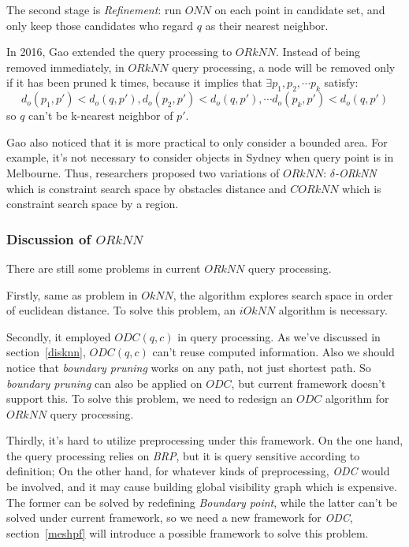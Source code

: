 The second stage is \textit{Refinement}: run $ONN$ on each point in candidate set, and only keep those
candidates who regard $q$ as their nearest neighbor.

In 2016, Gao extended the query processing to $\mathit{ORkNN}$\cite{gao2016reverse}. Instead of being
removed immediately, in $\mathit{ORkNN}$ query processing, a node will be removed only if it has been
pruned k times, because it implies that
$\exists p_1, p_2,\cdots p_k$ satisfy:
$$
d_o(p_1, p') < d_o(q, p'), d_o(p_2, p') < d_o(q, p'),
\cdots d_o(p_k, p') < d_o(q, p')
$$
so $q$ can't be k-nearest neighbor of $p'$.

Gao also noticed that it is more practical to only consider a bounded area. For example,
it's not necessary to consider objects in Sydney when query point is in Melbourne. Thus,
researchers proposed two variations of $\mathit{ORkNN}$: $\delta$\textit{-ORkNN} which is constraint search space by obstacles
distance and $\mathit{CORkNN}$ which is constraint search space by a region.

\subsubsection{Discussion of $\mathit{ORkNN}$}\label{disorknn}
There are still some problems in current $\mathit{ORkNN}$ query processing.

Firstly, same as problem in $\mathit{OkNN}$, the algorithm explores search space in order of euclidean
distance. To solve this problem, an $\mathit{iOkNN}$ algorithm is necessary.

Secondly, it employed $ODC(q, c)$ in query processing. As we've discussed in
section~\ref{disknn}, $ODC(q, c)$ can't reuse computed information.
Also we should notice that \textit{boundary pruning} works on any path, not just shortest path.
So \textit{boundary pruning} can also be applied on $ODC$, but current framework doesn't
support this. To solve this problem, we need to redesign an $ODC$ algorithm for $\mathit{ORkNN}$ query processing.

Thirdly, it's hard to utilize preprocessing under this framework.
On the one hand, the query processing relies on
\textit{BRP}, but it is query sensitive according to definition; On the other
hand, for whatever kinds of preprocessing, \textit{ODC} would be involved, and it may cause
building global visibility graph which is expensive. The former can be
solved by redefining \textit{Boundary point}, while the latter can't be solved under current
framework, so we need a new framework for \textit{ODC}, section~\ref{meshpf} will introduce a
possible framework to solve this problem.

